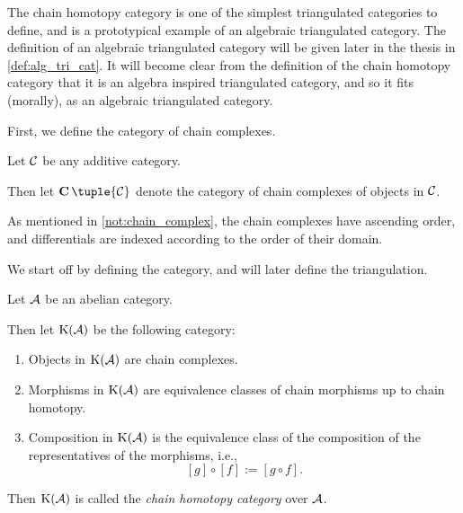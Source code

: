 The chain homotopy category is one of the simplest triangulated categories to define, and is a prototypical example of an algebraic triangulated category. The definition of an algebraic triangulated category will be given later in the thesis in \autoref{def:alg_tri_cat}. It will become clear from the definition of the chain homotopy category that it is an algebra inspired triangulated category, and so it fits (morally), as an algebraic triangulated category.


First, we define the category of chain complexes.

\begin{definition}
    \label{def:chain_complex}
    Let \( {\mathcal{C}} \) be any additive category.
    
    Then let \( \C \tuple{\Cc} \) denote the category of chain complexes of objects in \( {\mathcal{C}} \).

    As mentioned in \autoref{not:chain_complex}, the chain complexes have ascending order, and differentials are indexed according to the order of their domain.
\end{definition}

We start off by defining the category, and will later define the triangulation.

\begin{definition}
    \label{def:chain_homotopy_cat}
    Let \( {\mathcal{A}} \) be an abelian category.

    Then let \( \operatorname{K}({\mathcal{A}}) \) be the following category:
    \begin{enumerate}
        \item {
            Objects in \( \operatorname{K}({\mathcal{A}}) \) are chain complexes.
        }
        \item {
            Morphisms in \( \operatorname{K}({\mathcal{A}}) \) are equivalence classes of chain morphisms up to chain homotopy.
        }
        \item {
            Composition in \( \operatorname{K}({\mathcal{A}}) \) is the equivalence class of the composition of the representatives of the morphisms, i.e.,
            \[
                [g] \circ [f] := [g \circ f ].
            \]
        }
    \end{enumerate}

    Then \( \operatorname{K}({\mathcal{A}}) \) is called the \emph{chain homotopy category} over \( {\mathcal{A}} \).
\end{definition}

